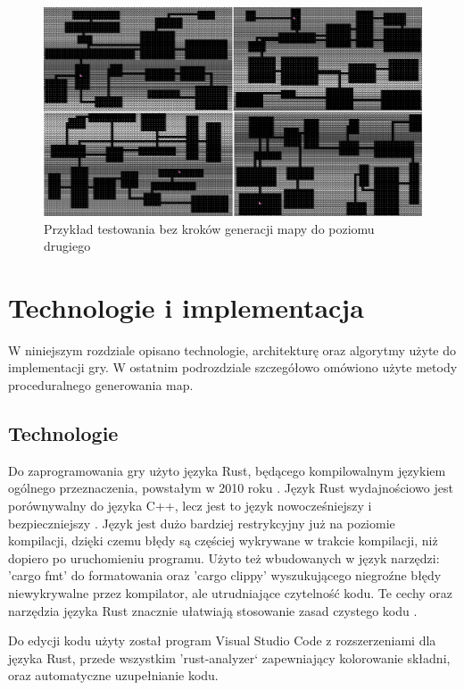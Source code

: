 \documentclass[12pt,twoside]{article}
\begin{document}
\FloatBarrier
\begin{figure}[ht]
	\centering
	\includegraphics[width=16cm]{images/mygame/tester_nosteps.png}
	\caption{Przykład testowania bez kroków generacji mapy do poziomu drugiego}
	\label{mygame:tester_nosteps}
\end{figure}
\FloatBarrier

\clearpage	



\section{Technologie i implementacja}
W niniejszym rozdziale opisano technologie, architekturę oraz algorytmy użyte do implementacji gry. W ostatnim podrozdziale szczegółowo omówiono użyte metody proceduralnego generowania map.


\subsection{Technologie}
Do zaprogramowania gry użyto języka Rust, będącego kompilowalnym językiem ogólnego przeznaczenia, powstałym w 2010 roku \cite{book_rust}. Język Rust wydajnościowo jest porównywalny do języka C++, lecz jest to język nowocześniejszy i bezpieczniejszy \cite{rust_vs_cpp}. Język jest dużo bardziej restrykcyjny już na poziomie kompilacji, dzięki czemu błędy są częściej wykrywane w trakcie kompilacji, niż dopiero po uruchomieniu programu. Użyto też wbudowanych w język narzędzi: 'cargo fmt' do formatowania oraz 'cargo clippy' wyszukującego niegroźne błędy niewykrywalne przez kompilator, ale utrudniające czytelność kodu. Te cechy oraz narzędzia języka Rust znacznie ułatwiają stosowanie zasad czystego kodu \cite{book_czystykod}.

Do edycji kodu użyty został program Visual Studio Code \cite{vs_code} z rozszerzeniami dla języka Rust, przede wszystkim 'rust-analyzer` zapewniający kolorowanie składni, oraz automatyczne uzupełnianie kodu.
\end{document}
